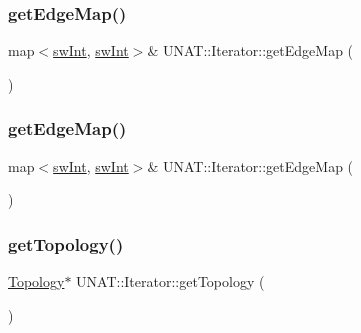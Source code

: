 \subsubsection{\texorpdfstring{getEdgeMap()}{getEdgeMap()}\hspace{0.1cm}{\footnotesize\ttfamily [1/2]}}
{\footnotesize\ttfamily map$<$\mbox{\hyperlink{include_2swMacro_8h_a113cf5f6b5377cdf3fac6aa4e443e9aa}{sw\+Int}}, \mbox{\hyperlink{include_2swMacro_8h_a113cf5f6b5377cdf3fac6aa4e443e9aa}{sw\+Int}}$>$\& U\+N\+A\+T\+::\+Iterator\+::get\+Edge\+Map (\begin{DoxyParamCaption}{ }\end{DoxyParamCaption})\hspace{0.3cm}{\ttfamily [inline]}}

\mbox{\label{classUNAT_1_1Iterator_ac5ce1cbee8e78efc52ba25d3da9eb9c8}} 
\subsubsection{\texorpdfstring{getEdgeMap()}{getEdgeMap()}\hspace{0.1cm}{\footnotesize\ttfamily [2/2]}}
{\footnotesize\ttfamily map$<$\mbox{\hyperlink{include_2swMacro_8h_a113cf5f6b5377cdf3fac6aa4e443e9aa}{sw\+Int}}, \mbox{\hyperlink{include_2swMacro_8h_a113cf5f6b5377cdf3fac6aa4e443e9aa}{sw\+Int}}$>$\& U\+N\+A\+T\+::\+Iterator\+::get\+Edge\+Map (\begin{DoxyParamCaption}{ }\end{DoxyParamCaption})\hspace{0.3cm}{\ttfamily [inline]}}

\mbox{\label{classUNAT_1_1Iterator_a22ec6ca24e5c28053cbda5a1970fe86c}} 
\subsubsection{\texorpdfstring{getTopology()}{getTopology()}\hspace{0.1cm}{\footnotesize\ttfamily [1/2]}}
{\footnotesize\ttfamily \mbox{\hyperlink{classUNAT_1_1Topology}{Topology}}$\ast$ U\+N\+A\+T\+::\+Iterator\+::get\+Topology (\begin{DoxyParamCaption}{ }\end{DoxyParamCaption})\hspace{0.3cm}{\ttfamily [inline]}}

